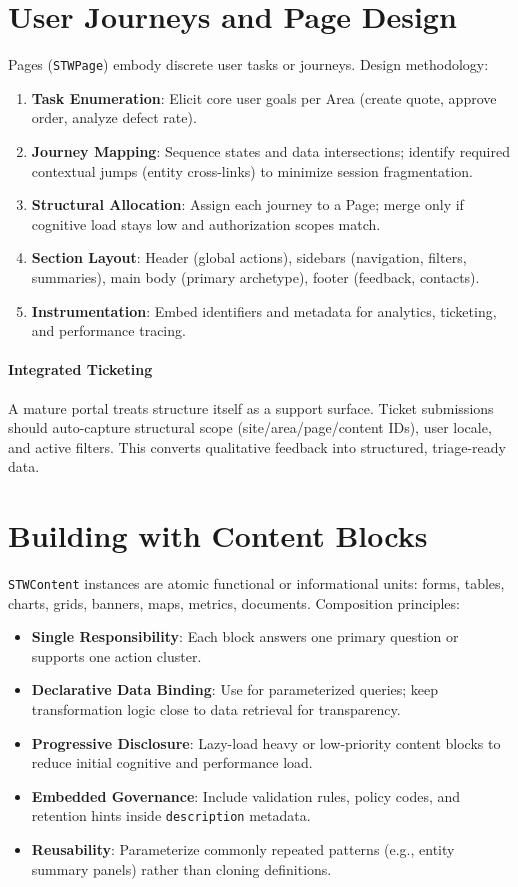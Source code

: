 \section{User Journeys and Page Design}
Pages (\texttt{STWPage}) embody discrete user tasks or journeys. Design methodology:
\begin{enumerate}
	\item \textbf{Task Enumeration}: Elicit core user goals per Area (create quote, approve order, analyze defect rate).
	\item \textbf{Journey Mapping}: Sequence states and data intersections; identify required contextual jumps (entity cross-links) to minimize session fragmentation.
	\item \textbf{Structural Allocation}: Assign each journey to a Page; merge only if cognitive load stays low and authorization scopes match.
	\item \textbf{Section Layout}: Header (global actions), sidebars (navigation, filters, summaries), main body (primary archetype), footer (feedback, contacts).
	\item \textbf{Instrumentation}: Embed identifiers and metadata for analytics, ticketing, and performance tracing.
\end{enumerate}
\paragraph{Integrated Ticketing} A mature portal treats structure itself as a support surface. Ticket submissions should auto-capture structural scope (site/area/page/content IDs), user locale, and active filters. This converts qualitative feedback into structured, triage-ready data.

\section{Building with Content Blocks}
\texttt{STWContent} instances are atomic functional or informational units: forms, tables, charts, grids, banners, maps, metrics, documents. Composition principles:
\begin{itemize}
	\item \textbf{Single Responsibility}: Each block answers one primary question or supports one action cluster.
	\item \textbf{Declarative Data Binding}: Use \wbpl{} for parameterized queries; keep transformation logic close to data retrieval for transparency.
	\item \textbf{Progressive Disclosure}: Lazy-load heavy or low-priority content blocks to reduce initial cognitive and performance load.
	\item \textbf{Embedded Governance}: Include validation rules, policy codes, and retention hints inside \texttt{description} metadata.
	\item \textbf{Reusability}: Parameterize commonly repeated patterns (e.g., entity summary panels) rather than cloning definitions.
\end{itemize}
